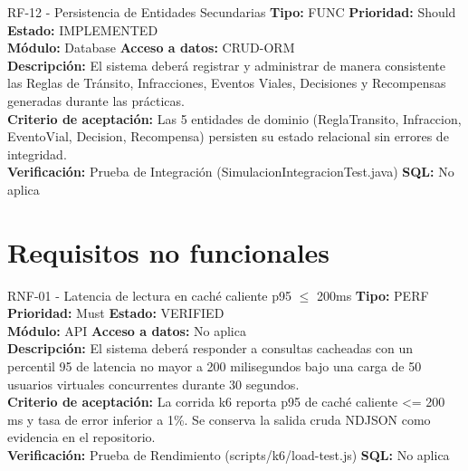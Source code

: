 \documentclass[11pt,a4paper]{article}
\begin{document}
\begin{requisito}{RF-12 - Persistencia de Entidades Secundarias}
    \textbf{Tipo:} FUNC \quad \textbf{Prioridad:} Should \quad \textbf{Estado:} IMPLEMENTED \\[0.2cm]
    \textbf{Módulo:} Database \quad \textbf{Acceso a datos:} CRUD-ORM \\[0.2cm]
    \textbf{Descripción:} El sistema deberá registrar y administrar de manera consistente las Reglas de Tránsito, Infracciones, Eventos Viales, Decisiones y Recompensas generadas durante las prácticas. \\[0.2cm]
    \textbf{Criterio de aceptación:} Las 5 entidades de dominio (ReglaTransito, Infraccion, EventoVial, Decision, Recompensa) persisten su estado relacional sin errores de integridad. \\[0.2cm]
    \textbf{Verificación:} Prueba de Integración (SimulacionIntegracionTest.java) \quad \textbf{SQL:} No aplica
\end{requisito}

\newpage
\section{Requisitos no funcionales}

\begin{requisito}{RNF-01 - Latencia de lectura en caché caliente p95 $\le$ 200ms}
    \textbf{Tipo:} PERF \quad \textbf{Prioridad:} Must \quad \textbf{Estado:} VERIFIED \\[0.2cm]
    \textbf{Módulo:} API \quad \textbf{Acceso a datos:} No aplica \\[0.2cm]
    \textbf{Descripción:} El sistema deberá responder a consultas cacheadas con un percentil 95 de latencia no mayor a 200 milisegundos bajo una carga de 50 usuarios virtuales concurrentes durante 30 segundos. \\[0.2cm]
    \textbf{Criterio de aceptación:} La corrida k6 reporta p95 de caché caliente <= 200 ms y tasa de error inferior a 1\%. Se conserva la salida cruda NDJSON como evidencia en el repositorio. \\[0.2cm]
    \textbf{Verificación:} Prueba de Rendimiento (scripts/k6/load-test.js) \quad \textbf{SQL:} No aplica
\end{requisito}
\end{document}
